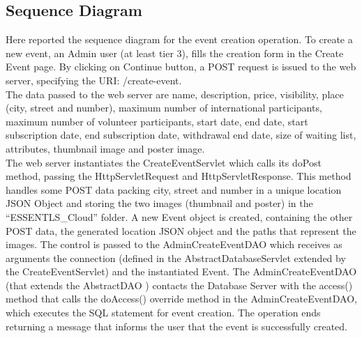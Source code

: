 \subsection{Sequence Diagram}


Here reported the sequence diagram for the event creation operation.
To create a new event, an Admin user (at least tier 3), fills the creation form in the Create Event page.
By clicking on Continue button, a POST request is issued to the web server, specifying the URI: /create-event. \\
The data passed to the web server are name, description, price, visibility, place (city, street and number),
maximum number of international participants, maximum number of volunteer participants, start date, end date,
start subscription date, end subscription date, withdrawal end date, size of waiting list, attributes,
thumbnail image and poster image. \\
The web server instantiates the CreateEventServlet which calls its doPost method, passing the HttpServletRequest
and HttpServletResponse. This method handles some POST data packing city, street and number in a unique location JSON
Object and storing the two images (thumbnail and poster) in the “ESSENTLS\_Cloud” folder.
A new Event object is created, containing the other POST data, the generated location JSON object and the paths that
represent the images. The control is passed to the AdminCreateEventDAO which receives as arguments the connection
(defined in the AbstractDatabaseServlet extended by the CreateEventServlet) and the instantiated Event.
The AdminCreateEventDAO (that extends the AbstractDAO ) contacts the Database Server with the access() method that
calls the doAccess() override method in the AdminCreateEventDAO, which executes the SQL statement for event creation.
The operation ends returning a message that informs the user that the event is successfully created.
